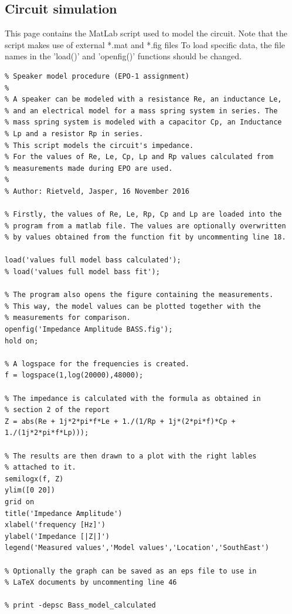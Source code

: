 \documentclass{article}
\begin{document}
\subsection{Circuit simulation}
This page contains  the MatLab script used to model the circuit. Note that the script makes use of external *.mat and *.fig files To load specific data, the file names in the 'load()' and 'openfig()' functions should be changed.
\begin{lstlisting}
% Speaker model procedure (EPO-1 assignment)
%
% A speaker can be modeled with a resistance Re, an inductance Le, 
% and an electrical model for a mass spring system in series. The 
% mass spring system is modeled with a capacitor Cp, an Inductance 
% Lp and a resistor Rp in series. 
% This script models the circuit's impedance. 
% For the values of Re, Le, Cp, Lp and Rp values calculated from 
% measurements made during EPO are used.
% 
% Author: Rietveld, Jasper, 16 November 2016

% Firstly, the values of Re, Le, Rp, Cp and Lp are loaded into the 
% program from a matlab file. The values are optionally overwritten 
% by values obtained from the function fit by uncommenting line 18.

load('values full model bass calculated');
% load('values full model bass fit');

% The program also opens the figure containing the measurements.
% This way, the model values can be plotted together with the 
% measurements for comparison.
openfig('Impedance Amplitude BASS.fig');
hold on;

% A logspace for the frequencies is created.
f = logspace(1,log(20000),48000);

% The impedance is calculated with the formula as obtained in
% section 2 of the report
Z = abs(Re + 1j*2*pi*f*Le + 1./(1/Rp + 1j*(2*pi*f)*Cp + 1./(1j*2*pi*f*Lp)));

% The results are then drawn to a plot with the right lables 
% attached to it.
semilogx(f, Z)
ylim([0 20])
grid on
title('Impedance Amplitude')
xlabel('frequency [Hz]')
ylabel('Impedance [|Z|]')
legend('Measured values','Model values','Location','SouthEast')

% Optionally the graph can be saved as an eps file to use in 
% LaTeX documents by uncommenting line 46

% print -depsc Bass_model_calculated
\end{lstlisting}
\end{document}
